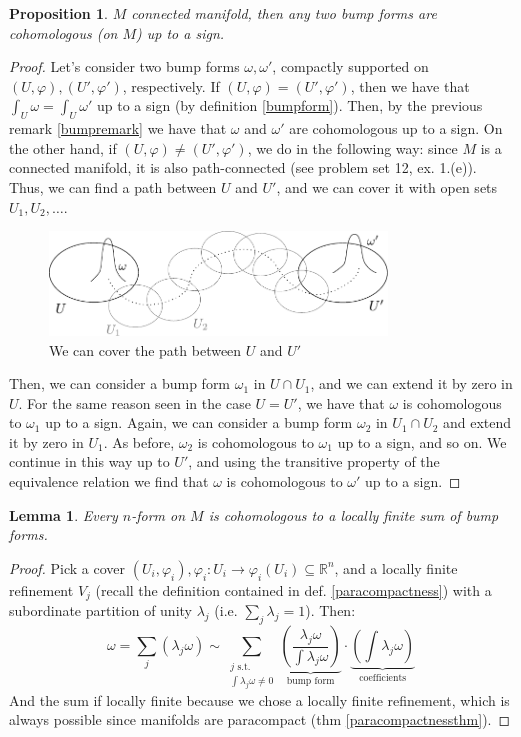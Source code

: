 \documentclass[a4paper,11pt,titlepage, article, oneside]{memoir}
\numberwithin{equation}{section}
\newtheorem{proposition}[theorem]{Proposition}
\newtheorem{lemma}[theorem]{Lemma}
\theoremstyle{definition}
\theoremstyle{remark}
\newcommand{\rfield}{\mathbb{R}}
\begin{document}
\begin{proposition} \label{prop2bumpforms}
$M$ connected manifold, then any two bump forms are cohomologous (on $M$) up to a sign.
\end{proposition}
\begin{proof}
Let's consider two bump forms $\omega, \omega'$, compactly supported on $(U, \varphi), (U', \varphi')$, respectively. If $(U, \varphi) = (U', \varphi')$, then we have that $\int_U \omega = \int_U \omega'$ up to a sign (by definition \ref{bumpform}). Then, by the previous remark \ref{bumpremark} we have that $\omega$ and $\omega'$ are cohomologous up to a sign. On the other hand, if $(U, \varphi) \not = (U', \varphi')$, we do in the following way: since $M$ is a connected manifold, it is also path-connected (see problem set 12, ex. 1.(e)). Thus, we can find a path between $U$ and $U'$, and we can cover it with open sets $U_1, U_2, \ldots$.
\begin{figure}[H] \label{Fig:bumpforms1}
     \centering
     \includegraphics[width=0.8\textwidth]{Images/bumpforms1.pdf} 
     \caption{We can cover the path between $U$ and $U'$}      
\end{figure}
Then, we can consider a bump form $\omega_1$ in $U \cap U_1$, and we can extend it by zero in $U$. For the same reason seen in the case $U=U'$, we have that $\omega$ is cohomologous to $\omega_1$ up to a sign. Again, we can consider a bump form $\omega_2$ in $U_1 \cap U_2$ and extend it by zero in $U_1$. As before, $\omega_2$ is cohomologous to $\omega_1$ up to a sign, and so on. We continue in this way up to $U'$, and using the transitive property of the equivalence relation we find that $\omega$ is cohomologous to $\omega'$ up to a sign.
\end{proof}

\begin{lemma} \label{lemmalocfinite}
Every $n$-form on $M$ is cohomologous to a locally finite sum of bump forms.
\end{lemma}
\begin{proof}
Pick a cover $(U_i, \varphi_i), \varphi_i \colon U_i \rightarrow \varphi_i(U_i) \subseteq \rfield^n$, and a locally finite refinement $V_j$ (recall the definition contained in def. \ref{paracompactness}) with a subordinate partition of unity $\lambda_j$ (i.e. $\sum_j \lambda_j = 1$). Then:
$$\omega = \sum\limits_j (\lambda_j \omega) \sim \sum\limits_{\substack{j \text{ s.t. } \\ \int \lambda_j \omega \not = 0}} \underbrace{\left( \frac{\lambda_j \omega}{\int \lambda_j \omega} \right)}_{\text{bump form}} \cdot \underbrace{\left ( \int \lambda_j \omega \right )}_{\text{coefficients}}$$
And the sum if locally finite because we chose a locally finite refinement, which is always possible since manifolds are paracompact (thm \ref{paracompactnessthm}).
\end{proof}
\end{document}
